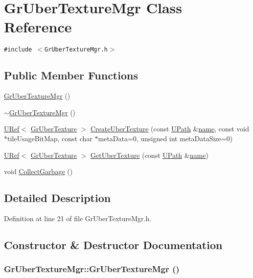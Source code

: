 \hypertarget{class_gr_uber_texture_mgr}{
\section{GrUberTextureMgr Class Reference}
\label{class_gr_uber_texture_mgr}
}
{\tt \#include $<$GrUberTextureMgr.h$>$}

\subsection*{Public Member Functions}
\begin{CompactItemize}
\item 
\hyperlink{class_gr_uber_texture_mgr_8dcf095974a9decc3e8be1aa31b573d9}{GrUberTextureMgr} ()
\item 
\hyperlink{class_gr_uber_texture_mgr_4ab7c838a075752a8b9288a787f88c3f}{$\sim$GrUberTextureMgr} ()
\item 
\hyperlink{class_u_ref}{URef}$<$ \hyperlink{class_gr_uber_texture}{GrUberTexture} $>$ \hyperlink{class_gr_uber_texture_mgr_5b50e74d5a3b89b7fe22adc1731bca14}{CreateUberTexture} (const \hyperlink{class_u_path}{UPath} \&\hyperlink{glext__bak_8h_bb62efe59ccdd153ce42e1a418352209}{name}, const void $\ast$tileUsageBitMap, const char $\ast$metaData=0, unsigned int metaDataSize=0)
\item 
\hyperlink{class_u_ref}{URef}$<$ \hyperlink{class_gr_uber_texture}{GrUberTexture} $>$ \hyperlink{class_gr_uber_texture_mgr_ecf501bff605e7027f3653ec97f261b6}{GetUberTexture} (const \hyperlink{class_u_path}{UPath} \&\hyperlink{glext__bak_8h_bb62efe59ccdd153ce42e1a418352209}{name})
\item 
void \hyperlink{class_gr_uber_texture_mgr_84abd636d04889498494d3edc9140260}{CollectGarbage} ()
\end{CompactItemize}


\subsection{Detailed Description}


Definition at line 21 of file GrUberTextureMgr.h.

\subsection{Constructor \& Destructor Documentation}
\hypertarget{class_gr_uber_texture_mgr_8dcf095974a9decc3e8be1aa31b573d9}{
\subsubsection[{GrUberTextureMgr}]{\setlength{\rightskip}{0pt plus 5cm}GrUberTextureMgr::GrUberTextureMgr ()}}
\label{class_gr_uber_texture_mgr_8dcf095974a9decc3e8be1aa31b573d9}




